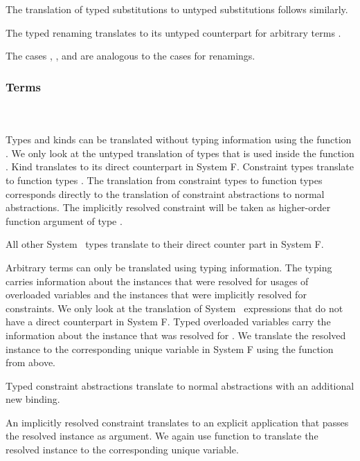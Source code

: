 \noindent The translation of typed substitutions to untyped substitutions follows similarly.
\DPTSub 

\noindent The typed renaming  translates to its untyped counterpart for arbitrary terms .

\noindent The cases , ,  and  are analogous to the cases for renamings. 

\subsubsection{Terms}\hfill\\\\
Types and kinds can be translated without typing information using the function .  
We only look at the untyped translation of types  that is used inside the function . Kind  translates to its direct counterpart in System F.
\DPTType
Constraint types \Constr{[}  \Constr{:}  \Constr{]⇒}  translate to function types   . 
The translation from constraint types to function types corresponds directly to the translation of constraint abstractions to normal abstractions. 
The implicitly resolved constraint will be taken as higher-order function argument of type .

\noindent All other System \Fo\ types translate to their direct counter part in System F.

\noindent Arbitrary terms can only be translated using typing information.
The typing carries information about the instances that were resolved for usages of overloaded variables and the instances that were implicitly resolved for constraints. 
We only look at the translation of System \Fo\ expressions that do not have a direct counterpart in System F.
\DPTTerms
Typed overloaded variables  carry the information  about the instance that was resolved for .
We translate the resolved instance to the corresponding unique variable in System F using the  function from above.

\noindent Typed constraint abstractions  translate to normal abstractions with an additional new binding. 

\noindent An implicitly resolved constraint  translates to an explicit application that passes the resolved instance as argument. We again use function  to translate the resolved instance  to the corresponding unique variable. 

